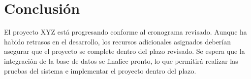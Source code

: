 \documentclass[12pt]{article}
\begin{document}
\section*{Conclusión}
El proyecto XYZ está progresando conforme al cronograma revisado. Aunque ha habido retrasos en el desarrollo, los recursos adicionales asignados deberían asegurar que el proyecto se complete dentro del plazo revisado. Se espera que la integración de la base de datos se finalice pronto, lo que permitirá realizar las pruebas del sistema e implementar el proyecto dentro del plazo.
\end{document}
